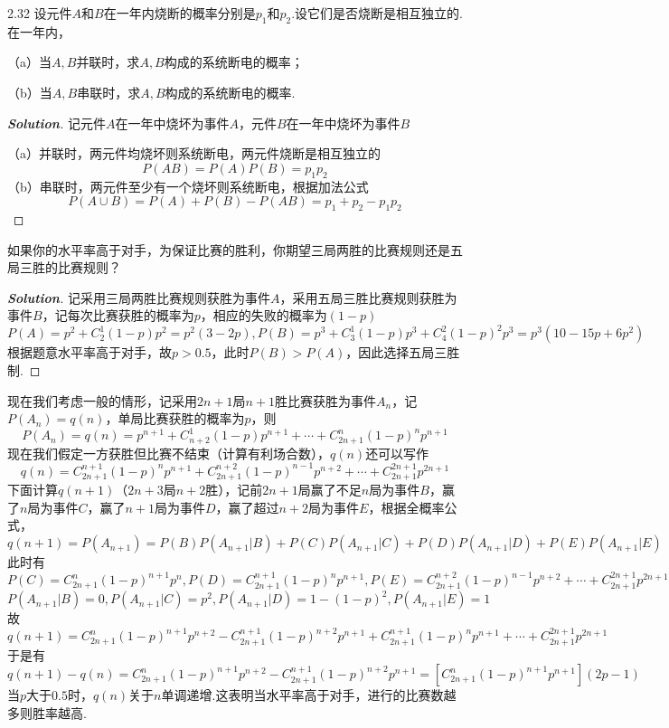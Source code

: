\documentclass[10pt, a4paper, oneside]{ctexart}
\newenvironment{solution}{\begin{proof}[\bf Solution]}{\end{proof}}
\begin{document}
2.32 设元件$A$和$B$在一年内烧断的概率分别是$p_1$和$p_2$.设它们是否烧断是相互独立的.在一年内，

（a）当$A,B$并联时，求$A,B$构成的系统断电的概率；

（b）当$A,B$串联时，求$A,B$构成的系统断电的概率.
\begin{solution}
记元件$A$在一年中烧坏为事件$A$，元件$B$在一年中烧坏为事件$B$

（a）并联时，两元件均烧坏则系统断电，两元件烧断是相互独立的
\[P(AB) = P(A)P(B) = {p_1}{p_2}\]
（b）串联时，两元件至少有一个烧坏则系统断电，根据加法公式
\[P(A \cup B) = P(A) + P(B) - P(AB) = {p_1} + {p_2} - {p_1}{p_2}\]
\end{solution}

 如果你的水平率高于对手，为保证比赛的胜利，你期望三局两胜的比赛规则还是五局三胜的比赛规则？
\begin{solution}
记采用三局两胜比赛规则获胜为事件$A$，采用五局三胜比赛规则获胜为事件$B$，记每次比赛获胜的概率为$p$，相应的失败的概率为$(1-p)$
\[P(A) = {p^2} + C_2^1(1 - p){p^2} = {p^2}(3 - 2p),P(B) = {p^3} + C_3^1(1 - p){p^3} + C_4^2{(1 - p)^2}{p^3} = {p^3}(10 - 15p + 6{p^2})\]
根据题意水平率高于对手，故$p>0.5$，此时$P(B)>P(A)$，因此选择五局三胜制.
\end{solution}
\begin{remark}
现在我们考虑一般的情形，记采用$2n+1$局$n+1$胜比赛获胜为事件$A_n$，记$P(A_n)=q(n)$，单局比赛获胜的概率为$p$，则
\[P(A_n)=q(n) = {p^{n + 1}} + C_{n + 2}^1(1 - p){p^{n + 1}} +  \cdots  + C_{2n + 1}^n{(1 - p)^n}{p^{n + 1}}\]
现在我们假定一方获胜但比赛不结束（计算有利场合数），$q(n)$还可以写作
\[q(n) = C_{2n + 1}^{n + 1}{(1 - p)^n}{p^{n + 1}} + C_{2n + 1}^{n + 2}{(1 - p)^{n - 1}}{p^{n + 2}} +  \cdots  + C_{2n + 1}^{2n + 1}{p^{2n + 1}}\]
下面计算$q(n+1)$（$2n+3$局$n+2$胜），记前$2n+1$局赢了不足$n$局为事件$B$，赢了$n$局为事件$C$，赢了$n+1$局为事件$D$，赢了超过$n+2$局为事件$E$，根据全概率公式，
\[q(n + 1) = P({A_{n + 1}}) = P(B)P({A_{n + 1}}|B) + P(C)P({A_{n + 1}}|C) + P(D)P({A_{n + 1}}|D) + P(E)P({A_{n + 1}}|E)\]
此时有
\[P(C) = C_{2n + 1}^n{(1 - p)^{n + 1}}{p^n},P(D) = C_{2n + 1}^{n + 1}{(1 - p)^n}{p^{n + 1}},P(E) = C_{2n + 1}^{n + 2}{(1 - p)^{n - 1}}{p^{n + 2}} +  \cdots  + C_{2n + 1}^{2n + 1}{p^{2n + 1}}\]
\[P({A_{n + 1}}|B) = 0,P({A_{n + 1}}|C) = {p^2},P({A_{n + 1}}|D) = 1 - {(1 - p)^2},P({A_{n + 1}}|E) = 1\]
故
\[q(n + 1) = C_{2n + 1}^n{(1 - p)^{n + 1}}{p^{n + 2}} - C_{2n + 1}^{n + 1}{(1 - p)^{n + 2}}{p^{n + 1}} + C_{2n + 1}^{n + 1}{(1 - p)^n}{p^{n + 1}} +  \cdots  + C_{2n + 1}^{2n + 1}{p^{2n + 1}}\]
于是有
\[q(n + 1) - q(n) = C_{2n + 1}^n{(1 - p)^{n + 1}}{p^{n + 2}} - C_{2n + 1}^{n + 1}{(1 - p)^{n + 2}}{p^{n + 1}} = \left[ {C_{2n + 1}^n{{(1 - p)}^{n + 1}}{p^{n + 1}}} \right](2p - 1)\]
当$p$大于$0.5$时，$q(n)$关于$n$单调递增.这表明当水平率高于对手，进行的比赛数越多则胜率越高.
\end{remark}
\end{document}
